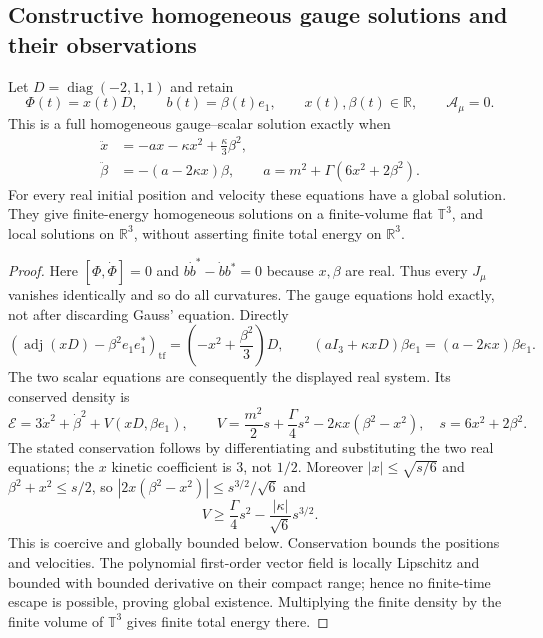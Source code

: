 \subsection{Constructive homogeneous gauge solutions and their observations}

\begin{theorem}
\label{q444:radial-gauge}
Let $D=\operatorname{diag}(-2,1,1)$ and retain
\[
 \Phi(t)=x(t)D,\qquad b(t)=\beta(t)e_1,\qquad
 x(t),\beta(t)\in\mathbb R,\qquad \mathcal A_\mu=0.
\]
This is a full homogeneous gauge--scalar solution exactly when
\begin{align*}
 \ddot x&=-a x-\kappa x^2+\frac{\kappa}{3}\beta^2,\\
 \ddot\beta&=-(a-2\kappa x)\beta,\qquad
 a=m^2+\Gamma(6x^2+2\beta^2).
\end{align*}
For every real initial position and velocity these equations have a
global solution. They give finite-energy homogeneous solutions on a
finite-volume flat $\mathbb T^3$, and local solutions on $\mathbb R^3$,
without asserting finite total energy on $\mathbb R^3$.
\end{theorem}
\begin{proof}
Here $[\Phi,\dot\Phi]=0$ and
$b\dot b^*-\dot b b^*=0$ because $x,\beta$ are real.
Thus every $J_\mu$ vanishes identically and so do all curvatures.
The gauge equations hold exactly, not after discarding Gauss' equation.
Directly
\[
 (\operatorname{adj}(xD)-\beta^2e_1e_1^*)_{\mathrm{tf}}
          =\left(-x^2+\frac{\beta^2}{3}\right)D,\qquad
 (aI_3+\kappa xD)\beta e_1=(a-2\kappa x)\beta e_1.
\]
The two scalar equations are consequently the displayed real system.
Its conserved density is
\[
 \mathcal E=3\dot x^2+\dot\beta^2+
 V(xD,\beta e_1),\qquad
 V=\frac{m^2}{2}s+\frac{\Gamma}{4}s^2
               -2\kappa x(\beta^2-x^2),\quad s=6x^2+2\beta^2.
\]
The stated conservation follows by differentiating and substituting the
two real equations; the $x$ kinetic coefficient is $3$, not $1/2$.
Moreover $|x|\le\sqrt{s/6}$ and $\beta^2+x^2\le s/2$, so
$|2x(\beta^2-x^2)|\le s^{3/2}/\sqrt6$ and
\[
 V\ge\frac{\Gamma}{4}s^2-\frac{|\kappa|}{\sqrt6}s^{3/2}.
\]
This is coercive and globally bounded below. Conservation bounds the
positions and velocities. The polynomial first-order vector field is
locally Lipschitz and bounded with bounded derivative on their compact
range; hence no finite-time escape is possible, proving global existence.
Multiplying the finite density by the finite volume of $\mathbb T^3$
gives finite total energy there.
\end{proof}

